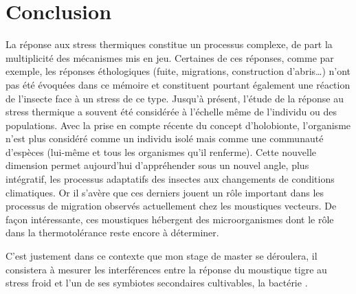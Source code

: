 
\section*{Conclusion}

La réponse aux stress thermiques constitue un processus complexe, de part la multiplicité des mécanismes mis en jeu. 
Certaines de ces réponses, comme par exemple, les réponses éthologiques (fuite, migrations, construction d'abris\ldots)  n'ont pas été évoquées dans ce mémoire et constituent pourtant également une réaction de l'insecte face à un stress de ce type.
Jusqu'à présent, l'étude de la réponse au stress thermique a souvent été considérée à l'échelle même de l'individu ou des populations.
Avec la prise en compte récente du concept d'holobionte, l'organisme n'est plus considéré comme un individu isolé mais comme une communauté d'espèces (lui-même et tous les organismes qu'il renferme).
Cette nouvelle dimension permet aujourd'hui d'appréhender sous un nouvel angle, plus intégratif, les processus adaptatifs des insectes aux changements de conditions climatiques.
Or il s'avère que ces derniers jouent un rôle important dans les processus de migration observés actuellement chez les moustiques vecteurs.
De façon intéressante, ces moustiques hébergent des microorganismes dont le rôle dans la thermotolérance reste encore à déterminer. 

C'est justement dans ce contexte que mon stage de master se déroulera, il consistera à mesurer les interférences entre la réponse du moustique tigre  au stress froid et l'un de ses symbiotes secondaires cultivables, la bactérie .

